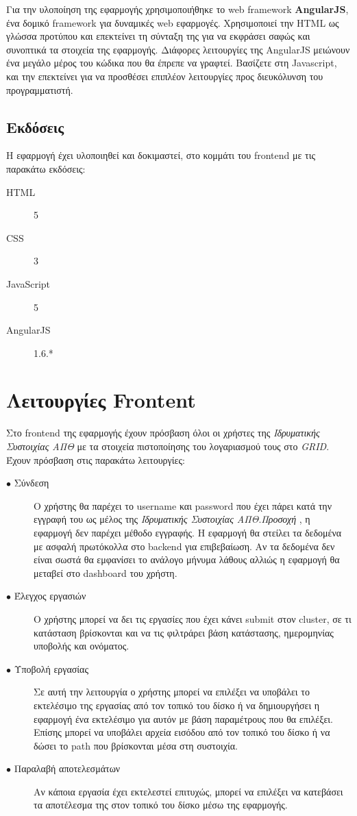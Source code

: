 Για την υλοποίηση της εφαρμογής χρησιμοποιήθηκε το web framework \textbf{AngularJS}, ένα δομικό framework για δυναμικές web εφαρμογές. Χρησιμοποιεί την HTML ως γλώσσα προτύπου και επεκτείνει τη σύνταξη της για να εκφράσει σαφώς και συνοπτικά τα στοιχεία της εφαρμογής. Διάφορες  λειτουργίες της AngularJS μειώνουν ένα μεγάλο μέρος του κώδικα που θα έπρεπε να γραφτεί. Βασίζετε στη Javascript, και την επεκτείνει για να προσθέσει επιπλέον λειτουργίες προς διευκόλυνση του προγραμματιστή.

\subsection{Εκδόσεις}

Η εφαρμογή έχει υλοποιηθεί και δοκιμαστεί, στο κομμάτι του frontend με τις παρακάτω εκδόσεις:

\begin{description}
\item [HTML] 5
\item [CSS] 3
\item [JavaScript] 5
\item [AngularJS] 1.6.*
\end{description}


\vspace{60mm}

\section{Λειτουργίες Frontent}

Στο frontend της εφαρμογής έχουν πρόσβαση όλοι οι χρήστες της  \textit{Ιδρυματικής Συστοιχίας ΑΠΘ} με τα στοιχεία πιστοποίησης του λογαριασμού τους στο \textit{GRID}. Έχουν πρόσβαση στις παρακάτω λειτουργίες:

\begin{description}
  \item[$\bullet$ Σύνδεση] O χρήστης θα παρέχει το username και password που έχει πάρει κατά την εγγραφή του ως μέλος της \textit{Ιδρυματικής Συστοιχίας ΑΠΘ}.\textit{Προσοχή} , η εφαρμογή δεν παρέχει μέθοδο εγγραφής. Η εφαρμογή θα στείλει τα δεδομένα με ασφαλή πρωτόκολλα στο backend για επιβεβαίωση. Αν τα δεδομένα δεν είναι σωστά θα εμφανίσει το ανάλογο μήνυμα λάθους αλλιώς η εφαρμογή θα μεταβεί στο dashboard του χρήστη.
  \item[$\bullet$ Έλεγχος εργασιών] Ο χρήστης μπορεί να δει τις εργασίες που έχει κάνει submit στον cluster, σε τι κατάσταση βρίσκονται και να τις φιλτράρει βάση κατάστασης, ημερομηνίας υποβολής και ονόματος.
    \item[$\bullet$ Υποβολή εργασίας] Σε αυτή την λειτουργία ο χρήστης μπορεί να επιλέξει να υποβάλει το εκτελέσιμο της εργασίας από τον τοπικό του δίσκο ή να δημιουργήσει η εφαρμογή ένα εκτελέσιμο για αυτόν με βάση παραμέτρους που θα επιλέξει. Επίσης μπορεί να υποβάλει αρχεία εισόδου από τον τοπικό του δίσκο ή να δώσει το path που βρίσκονται μέσα στη συστοιχία.
    \item[$\bullet$ Παραλαβή αποτελεσμάτων] Αν κάποια εργασία έχει εκτελεστεί επιτυχώς, μπορεί να επιλέξει να κατεβάσει τα αποτέλεσμα της στον τοπικό του δίσκο μέσω της εφαρμογής.
\end{description}

